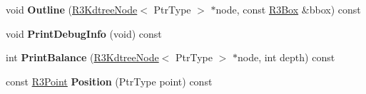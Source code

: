 \begin{DoxyCompactItemize}
\item 
void {\bfseries Outline} (\hyperlink{class_r3_kdtree_node}{R3\+Kdtree\+Node}$<$ Ptr\+Type $>$ $\ast$node, const \hyperlink{class_r3_box}{R3\+Box} \&bbox) const \hypertarget{class_r3_kdtree_a7c073edda35b2bca06da1340da5a13bc}{}\label{class_r3_kdtree_a7c073edda35b2bca06da1340da5a13bc}

\item 
void {\bfseries Print\+Debug\+Info} (void) const \hypertarget{class_r3_kdtree_ae0bb4f814ee2a06d1b0a200dbc4174c7}{}\label{class_r3_kdtree_ae0bb4f814ee2a06d1b0a200dbc4174c7}

\item 
int {\bfseries Print\+Balance} (\hyperlink{class_r3_kdtree_node}{R3\+Kdtree\+Node}$<$ Ptr\+Type $>$ $\ast$node, int depth) const \hypertarget{class_r3_kdtree_af33b78d6c7a4869377c9bfec86d93ee1}{}\label{class_r3_kdtree_af33b78d6c7a4869377c9bfec86d93ee1}

\item 
const \hyperlink{class_r3_point}{R3\+Point} {\bfseries Position} (Ptr\+Type point) const \hypertarget{class_r3_kdtree_a660e8024d23b0953217a12fcdbf09161}{}\label{class_r3_kdtree_a660e8024d23b0953217a12fcdbf09161}

\end{DoxyCompactItemize}
